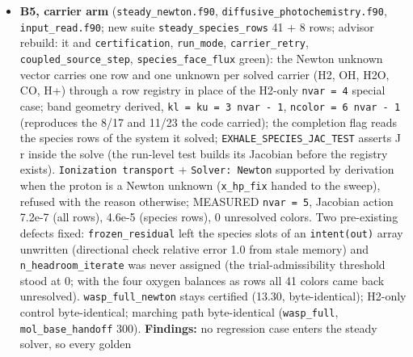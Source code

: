 \documentclass[english,a4paper]{my_memo}
\begin{document}
\begin{itemize}
  two-iteration energy update, the CO ceiling, the cell-velocity carrier
  advection, the element advective term, DB96 eq. (39), the H3+ clamp, the
  second H2 partition function) kept as dated records naming the removing
  item. Stale values corrected in passing: \texttt{e\_lw\_photon\_erg} 1.88021e-11 erg
  (11.7354 eV) over 912-1201 A, \texttt{binary\_element\_diffusion.f90} 3037 lines,
  a2 section 1\textquotesingle s chemical count now passed by the marching caller. All 190
  names introduced grepped present in \texttt{src/}. Recorded: pre-existing
  markdown table pipe misalignments (unescaped \texttt{\textbar{}} in math) in a2, b4,
  code\_status, d0; two markdown line citations of
  \texttt{grid\_and\_gates/README.md} left.
\item
  \textbf{B5, carrier arm} (\texttt{steady\_newton.f90}, \texttt{diffusive\_photochemistry.f90},
  \texttt{input\_read.f90}; new suite \texttt{steady\_species\_rows} 41 + 8 rows; advisor
  rebuild: it and \texttt{certification}, \texttt{run\_mode}, \texttt{carrier\_retry},
  \texttt{coupled\_source\_step}, \texttt{species\_face\_flux} green): the Newton unknown
  vector carries one row and one unknown per solved carrier (H2, OH, H2O,
  CO, H+) through a row registry in place of the H2-only \texttt{nvar\ =\ 4} special
  case; band geometry derived, \texttt{kl\ =\ ku\ =\ 3\ nvar\ -\ 1}, \texttt{ncolor\ =\ 6\ nvar\ -\ 1}
  (reproduces the 8/17 and 11/23 the code carried); the completion flag
  reads the species rows of the system it solved; \texttt{EXHALE\_SPECIES\_JAC\_TEST}
  asserts J r inside the solve (the run-level test builds its Jacobian
  before the registry exists). \texttt{Ionization\ transport} + \texttt{Solver:\ Newton}
  supported by derivation when the proton is a Newton unknown (\texttt{x\_hp\_fix}
  handed to the sweep), refused with the reason otherwise; MEASURED
  \texttt{nvar\ =\ 5}, Jacobian action 7.2e-7 (all rows), 4.6e-5 (species rows), 0
  unresolved colors. Two pre-existing defects fixed: \texttt{frozen\_residual} left
  the species slots of an \texttt{intent(out)} array unwritten (directional check
  relative error 1.0 from stale memory) and \texttt{n\_headroom\_iterate} was never
  assigned (the trial-admissibility threshold stood at 0; with the four
  oxygen balances as rows all 41 colors came back unresolved). \texttt{wasp\_full\_newton}
  stays certified (13.30, byte-identical); H2-only control byte-identical;
  marching path byte-identical (\texttt{wasp\_full}, \texttt{mol\_base\_handoff} 300).
  \textbf{Findings:} no regression case enters the steady solver, so every golden

\end{itemize}
\end{document}

